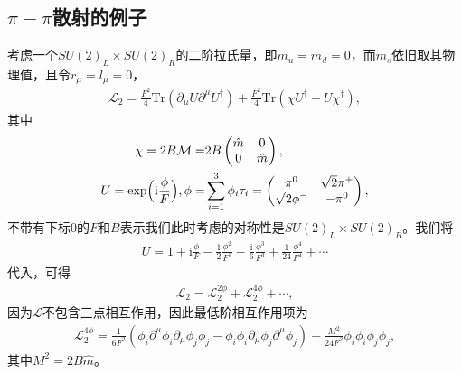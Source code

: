\documentclass[aps,tightenlines,16pt]{ctexart}
\numberwithin{equation}{section}
\newcommand{\mL}{\mathcal{L}}
\begin{document}
\subsection{$\pi-\pi$散射的例子}
考虑一个$SU(2)_L\times SU(2)_R$的二阶拉氏量，即$m_u=m_d=0$，而$m_s$依旧取其物理值，且令$r_{\mu}=l_{\mu}=0$，
\begin{align}
   \mL_2 = \frac{F^2}{4}\text{Tr}(\partial_{\mu}U\partial^{\mu}U^{\dagger})+\frac{F^2}{4}\text{Tr}(\chi U^{\dagger}+U\chi^{\dagger}),
\end{align}
其中
\begin{align*}
   \chi = 2B\mathcal{M} = &2B
   \begin{pmatrix}
      \hat{m} & 0\\
      0 & \hat{m}
   \end{pmatrix},\\
U=\text{exp}\Bigl(\mbox{i}\frac{\phi}{F}\Bigr),
\phi =& \sum_{i=1}^3 \phi_i \tau_i =
\begin{pmatrix}
   \pi^0 & \sqrt{2}\pi^{+}\\
   \sqrt{2}\phi^{-} & -\pi^0
\end{pmatrix},
\end{align*}
不带有下标0的$F$和$B$表示我们此时考虑的对称性是$SU(2)_L\times SU(2)_R$。我们将
\begin{align}
   U = 1 +\mbox{i}\frac{\phi}{F}-\frac{1}{2}\frac{\phi^2}{F^2}-\frac{\mbox{i}}{6}\frac{\phi^3}{F^3}+\frac{1}{24}\frac{\phi^4}{F^4}+\cdots
\end{align}
代入，可得
\begin{align}
   \mL_2 =\mL_2^{2\phi}+\mL_2^{4\phi}+\cdots, 
\end{align}
因为$\mL$不包含三点相互作用，因此最低阶相互作用项为
\begin{align}
   \mL_2^{4\phi}=\frac{1}{6F^2}(\phi_i\partial^{\mu}\phi_i\partial_{\mu}\phi_j\phi_j-\phi_i\phi_i\partial_{\mu}\phi_j\partial^{\mu}\phi_j)+\frac{M^2}{24F^2}\phi_i\phi_i\phi_j\phi_j,
\end{align}
其中$M^2=2B\hat{m}$。
\end{document}
